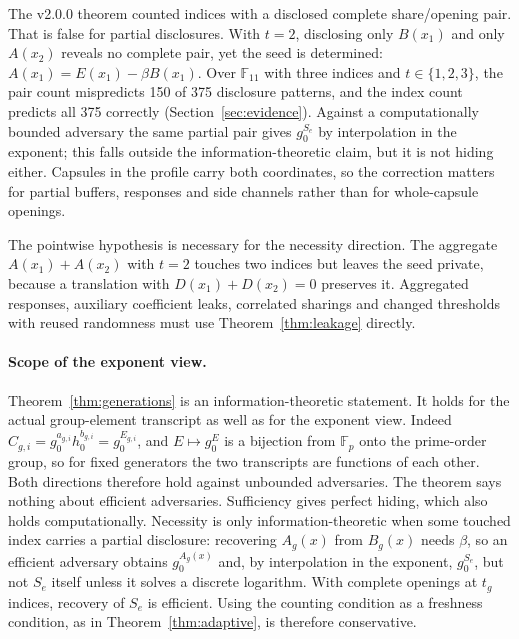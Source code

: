 \documentclass[pdflatex,sn-mathphys-num]{sn-jnl}
\theoremstyle{plain}
\theoremstyle{definition}
\newcommand{\F}{\mathbb{F}}
\begin{document}
The v2.0.0 theorem counted indices with a disclosed complete share/opening pair. That is false for partial disclosures. With $t=2$, disclosing only $B(x_1)$ and only $A(x_2)$ reveals no complete pair, yet the seed is determined: $A(x_1)=E(x_1)-\beta B(x_1)$. Over $\F_{11}$ with three indices and $t\in\{1,2,3\}$, the pair count mispredicts 150 of 375 disclosure patterns, and the index count predicts all 375 correctly (Section~\ref{sec:evidence}). Against a computationally bounded adversary the same partial pair gives $g_0^{S_e}$ by interpolation in the exponent; this falls outside the information-theoretic claim, but it is not hiding either. Capsules in the profile carry both coordinates, so the correction matters for partial buffers, responses and side channels rather than for whole-capsule openings.

The pointwise hypothesis is necessary for the necessity direction. The aggregate $A(x_1)+A(x_2)$ with $t=2$ touches two indices but leaves the seed private, because a translation with $D(x_1)+D(x_2)=0$ preserves it. Aggregated responses, auxiliary coefficient leaks, correlated sharings and changed thresholds with reused randomness must use Theorem~\ref{thm:leakage} directly.

\paragraph{Scope of the exponent view.}
Theorem~\ref{thm:generations} is an information-theoretic statement. It holds for the actual group-element transcript as well as for the exponent view. Indeed $C_{g,i}=g_0^{a_{g,i}}h_0^{b_{g,i}}=g_0^{E_{g,i}}$, and $E\mapsto g_0^E$ is a bijection from $\F_p$ onto the prime-order group, so for fixed generators the two transcripts are functions of each other. Both directions therefore hold against unbounded adversaries. The theorem says nothing about efficient adversaries. Sufficiency gives perfect hiding, which also holds computationally. Necessity is only information-theoretic when some touched index carries a partial disclosure: recovering $A_g(x)$ from $B_g(x)$ needs $\beta$, so an efficient adversary obtains $g_0^{A_g(x)}$ and, by interpolation in the exponent, $g_0^{S_e}$, but not $S_e$ itself unless it solves a discrete logarithm. With complete openings at $t_g$ indices, recovery of $S_e$ is efficient. Using the counting condition as a freshness condition, as in Theorem~\ref{thm:adaptive}, is therefore conservative.
\end{document}
